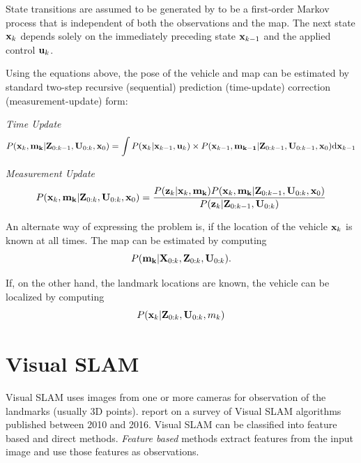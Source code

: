 State transitions are assumed to be generated by to be a first-order Markov process that is independent of both the observations and the map. The next state ${\bf x}_k$ depends solely on the immediately preceding state ${\bf x}_{k-1}$ and the applied control ${\bf u}_k$.

Using the equations above, the pose of the vehicle and map can be estimated by standard two-step recursive (sequential) prediction (time-update) correction (measurement-update) form:

\textit{Time Update}
\begin{equation}
P({\bf x}_{k},{\bf m_k}\vert {\bf Z}_{0:k-1},{\bf U}_{0:k},{\bf x}_{0})= \int P({\bf x}_{k}\vert {\bf x}_{k-1},{\bf u}_{k}) \times P({\bf x}_{k-1},{\bf m_{k-1}}\vert {\bf Z}_{0:k-1}, {\bf U}_{0:k-1},{\bf x}_{0}){\rm d}{\bf x}_{k-1}
\end{equation}

\textit{Measurement Update}
\begin{equation}
P({\bf x}_{k},{\bf m_k}\vert {\bf Z}_{0:k},{\bf U}_{0:k},{\bf x}_{0}) = {P({\bf z}_{k}\vert {\bf x}_{k},{\bf m_k})P({\bf x}_{k}, {\bf m_k}\vert {\bf Z}_{0:k-1},{\bf U}_{0:k},{\bf x}_{0})\over P({\bf z}_{k}\vert {\bf Z}_{0:k-1},{\bf U}_{0:k})}
\end{equation}

An alternate way of expressing the problem is, if the location of the vehicle ${\bf x}_k$ is known at all times. The map can be estimated by computing
\begin{equation}
P({\bf m_k}\vert {\bf X}_{0:k},{\bf Z}_{0:k}, {\bf U}_{0:k}).
\end{equation}

If, on the other hand, the landmark locations are known, the vehicle can be localized by computing
\begin{equation}
P({\bf x}_k\vert {\bf Z}_{0:k},{\bf U}_{0:k}, m_k)
\end{equation}

\section{Visual SLAM}
Visual SLAM uses images from one or more cameras for observation of the landmarks (usually 3D points).  report on a survey of Visual SLAM algorithms published between 2010 and 2016. Visual SLAM can be classified into feature based and direct methods. \textit{Feature based} methods extract features from the input image and use those features as observations.

